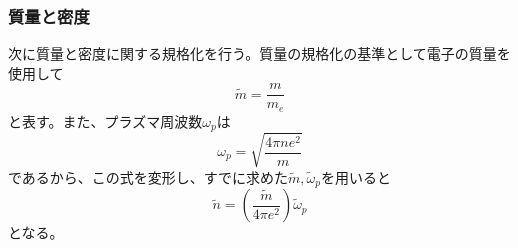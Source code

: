 \documentclass[a4paper,11pt,titlepage]{jarticle}
\numberwithin{equation}{section} %
\begin{document}
  
  \subsubsection{質量と密度}
  次に質量と密度に関する規格化を行う。質量の規格化の基準として電子の質量を使用して
  \begin{equation}
    \label{eq:3-2-7}
    \tilde m=\frac{m}{m_e}
  \end{equation}
  と表す。また、プラズマ周波数$\omega_p$は
  \begin{equation}
    \label{eq:3-2-8}
    \omega_p=\sqrt{\frac{4\pi n e^2}{m}}
  \end{equation}
  であるから、この式を変形し、すでに求めた$\tilde m,\tilde \omega_p$を用いると
  \begin{equation}
    \label{eq:3-2-9}
    \tilde n= (\frac{\tilde m}{4\pi e^2})\tilde \omega_p
  \end{equation}
  となる。\\

  
\end{document}
